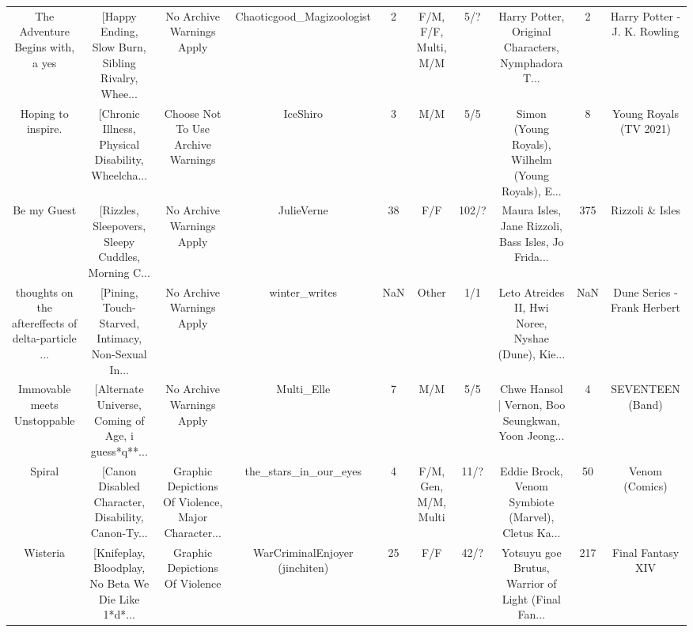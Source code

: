 \begin{table}[h!]
{\begin{tabular}{|c|c|c|c|c|c|c|c|c|c|}
                  The Adventure Begins with, a yes & [Happy Ending, Slow Burn, Sibling Rivalry, Whee... &                          No Archive Warnings Apply &          Chaoticgood\_Magizoologist &         2 &             F/M, F/F, Multi, M/M &      5/? & Harry Potter, Original Characters, Nymphadora T... &        2 &                       Harry Potter - J. K. Rowling \\
                                Hoping to inspire. & [Chronic Illness, Physical Disability, Wheelcha... &                 Choose Not To Use Archive Warnings &                           IceShiro &         3 &                              M/M &      5/5 & Simon (Young Royals), Wilhelm (Young Royals), E... &        8 &                             Young Royals (TV 2021) \\
                                       Be my Guest & [Rizzles, Sleepovers, Sleepy Cuddles, Morning C... &                          No Archive Warnings Apply &                         JulieVerne &        38 &                              F/F &    102/? & Maura Isles, Jane Rizzoli, Bass Isles, Jo Frida... &      375 &                                    Rizzoli \& Isles \\
thoughts on the aftereffects of delta-particle ... & [Pining, Touch-Starved, Intimacy, Non-Sexual In... &                          No Archive Warnings Apply &                      winter\_writes &       NaN &                            Other &      1/1 & Leto Atreides II, Hwi Noree, Nyshae (Dune), Kie... &      NaN &                        Dune Series - Frank Herbert \\
                       Immovable meets Unstoppable & [Alternate Universe, Coming of Age, i guess*q**... &                          No Archive Warnings Apply &                         Multi\_Elle &         7 &                              M/M &      5/5 & Chwe Hansol | Vernon, Boo Seungkwan, Yoon Jeong... &        4 &                                   SEVENTEEN (Band) \\
                                            Spiral & [Canon Disabled Character, Disability, Canon-Ty... & Graphic Depictions Of Violence, Major Character... &              the\_stars\_in\_our\_eyes &         4 &             F/M, Gen, M/M, Multi &     11/? & Eddie Brock, Venom Symbiote (Marvel), Cletus Ka... &       50 &                                     Venom (Comics) \\
                                          Wisteria & [Knifeplay, Bloodplay, No Beta We Die Like 1*d*... &                     Graphic Depictions Of Violence &     WarCriminalEnjoyer (jinchiten) &        25 &                              F/F &     42/? & Yotsuyu goe Brutus, Warrior of Light (Final Fan... &      217 &                                  Final Fantasy XIV \\

\end{tabular}}
\end{table}

